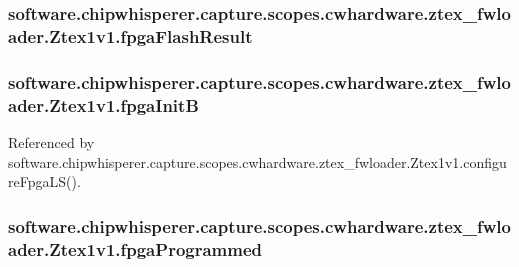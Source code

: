 \subsubsection[{fpga\+Flash\+Result}]{\setlength{\rightskip}{0pt plus 5cm}software.\+chipwhisperer.\+capture.\+scopes.\+cwhardware.\+ztex\+\_\+fwloader.\+Ztex1v1.\+fpga\+Flash\+Result}\label{classsoftware_1_1chipwhisperer_1_1capture_1_1scopes_1_1cwhardware_1_1ztex__fwloader_1_1Ztex1v1_a9bcf6fbf1c3b7937e80e76fac413e8a0}
\hypertarget{classsoftware_1_1chipwhisperer_1_1capture_1_1scopes_1_1cwhardware_1_1ztex__fwloader_1_1Ztex1v1_a1a090c4efd8ca9dc5fe29bccd77e4aa0}{}
\subsubsection[{fpga\+Init\+B}]{\setlength{\rightskip}{0pt plus 5cm}software.\+chipwhisperer.\+capture.\+scopes.\+cwhardware.\+ztex\+\_\+fwloader.\+Ztex1v1.\+fpga\+Init\+B}\label{classsoftware_1_1chipwhisperer_1_1capture_1_1scopes_1_1cwhardware_1_1ztex__fwloader_1_1Ztex1v1_a1a090c4efd8ca9dc5fe29bccd77e4aa0}


Referenced by software.\+chipwhisperer.\+capture.\+scopes.\+cwhardware.\+ztex\+\_\+fwloader.\+Ztex1v1.\+configure\+Fpga\+L\+S().

\hypertarget{classsoftware_1_1chipwhisperer_1_1capture_1_1scopes_1_1cwhardware_1_1ztex__fwloader_1_1Ztex1v1_a84f87abe78020c30e63bde8ef43491cb}{}
\subsubsection[{fpga\+Programmed}]{\setlength{\rightskip}{0pt plus 5cm}software.\+chipwhisperer.\+capture.\+scopes.\+cwhardware.\+ztex\+\_\+fwloader.\+Ztex1v1.\+fpga\+Programmed}\label{classsoftware_1_1chipwhisperer_1_1capture_1_1scopes_1_1cwhardware_1_1ztex__fwloader_1_1Ztex1v1_a84f87abe78020c30e63bde8ef43491cb}


